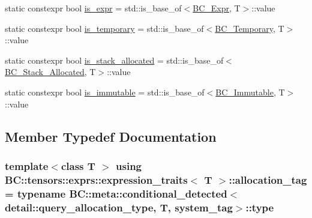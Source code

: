 \begin{DoxyCompactItemize}
\item 
static constexpr bool \hyperlink{structBC_1_1tensors_1_1exprs_1_1expression__traits_a11b9ac090e8715f9376590a03c8f6afd}{is\+\_\+expr} = std\+::is\+\_\+base\+\_\+of$<$\hyperlink{classBC_1_1tensors_1_1exprs_1_1BC__Expr}{B\+C\+\_\+\+Expr}, T$>$\+::value
\item 
static constexpr bool \hyperlink{structBC_1_1tensors_1_1exprs_1_1expression__traits_a931646f14b49daddf77d9f6603b9936a}{is\+\_\+temporary} = std\+::is\+\_\+base\+\_\+of$<$\hyperlink{classBC_1_1tensors_1_1exprs_1_1BC__Temporary}{B\+C\+\_\+\+Temporary}, T$>$\+::value
\item 
static constexpr bool \hyperlink{structBC_1_1tensors_1_1exprs_1_1expression__traits_a43c094c4c1101ff8959bb21c74b0cd3f}{is\+\_\+stack\+\_\+allocated} = std\+::is\+\_\+base\+\_\+of$<$\hyperlink{classBC_1_1tensors_1_1exprs_1_1BC__Stack__Allocated}{B\+C\+\_\+\+Stack\+\_\+\+Allocated}, T$>$\+::value
\item 
static constexpr bool \hyperlink{structBC_1_1tensors_1_1exprs_1_1expression__traits_a555e0eff871b0495d9405a436d9a1f4d}{is\+\_\+immutable} = std\+::is\+\_\+base\+\_\+of$<$\hyperlink{classBC_1_1tensors_1_1exprs_1_1BC__Immutable}{B\+C\+\_\+\+Immutable}, T$>$\+::value
\end{DoxyCompactItemize}


\subsection{Member Typedef Documentation}
\subsubsection[{\texorpdfstring{allocation\+\_\+tag}{allocation_tag}}]{\setlength{\rightskip}{0pt plus 5cm}template$<$class T $>$ using {\bf B\+C\+::tensors\+::exprs\+::expression\+\_\+traits}$<$ T $>$\+::{\bf allocation\+\_\+tag} =  typename {\bf B\+C\+::meta\+::conditional\+\_\+detected}$<${\bf detail\+::query\+\_\+allocation\+\_\+type}, T, {\bf system\+\_\+tag}$>$\+::type}\hypertarget{structBC_1_1tensors_1_1exprs_1_1expression__traits_afabecef46ed2bcd596923189b244b384}{}\label{structBC_1_1tensors_1_1exprs_1_1expression__traits_afabecef46ed2bcd596923189b244b384}
